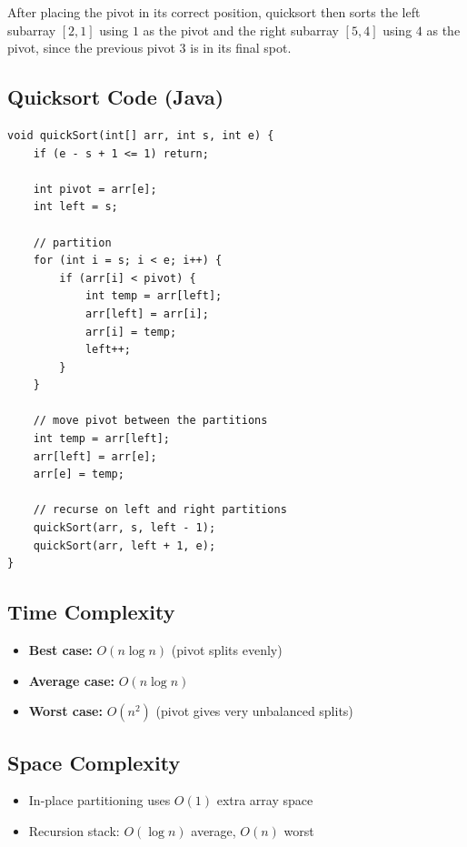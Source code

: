 







After placing the pivot in its correct position, quicksort then sorts the left subarray $[2,1]$ using $1$ as the pivot and the right subarray $[5, 4]$ using $4$ as the pivot, since the previous pivot $3$ is in its final spot. 
\subsection{Quicksort Code (Java)}
\begin{verbatim}
void quickSort(int[] arr, int s, int e) {
    if (e - s + 1 <= 1) return;

    int pivot = arr[e];
    int left = s;

    // partition
    for (int i = s; i < e; i++) {
        if (arr[i] < pivot) {
            int temp = arr[left];
            arr[left] = arr[i];
            arr[i] = temp;
            left++;
        }
    }

    // move pivot between the partitions
    int temp = arr[left];
    arr[left] = arr[e];
    arr[e] = temp;

    // recurse on left and right partitions
    quickSort(arr, s, left - 1);
    quickSort(arr, left + 1, e);
}
\end{verbatim}

\subsection{Time Complexity}
\begin{itemize}
  \item \textbf{Best case:} $O(n\log n)$ (pivot splits evenly)
  \item \textbf{Average case:} $O(n\log n)$
  \item \textbf{Worst case:} $O(n^2)$ (pivot gives very unbalanced splits)
\end{itemize}

\subsection{Space Complexity}
\begin{itemize}
  \item In-place partitioning uses $O(1)$ extra array space
  \item Recursion stack: $O(\log n)$ average, $O(n)$ worst
\end{itemize}